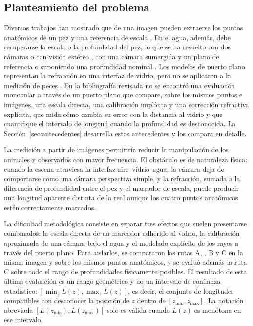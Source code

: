 \subsection{Planteamiento del problema}

Diversos trabajos han mostrado que de una imagen pueden extraerse los puntos anatómicos de un pez y una referencia de escala \parencite{Monkman2019,Saleh2023,Tseng2020}. En el agua, además, debe recuperarse la escala o la profundidad del pez, lo que se ha resuelto con dos cámaras o con visión estéreo \parencite{AlJubouri2017,Zhou2023,Seibold2026}, con una cámara sumergida y un plano de referencia \parencite{Vijayalakshmi2026} o suponiendo una profundidad nominal \parencite{Yin2026}. Los modelos de puerto plano representan la refracción en una interfaz de vidrio, pero no se aplicaron a la medición de peces \parencite{Luczynski2017,Seegraber2025}. En la bibliografía revisada no se encontró una evaluación monocular a través de un puerto plano que compare, sobre los mismos puntos e imágenes, una escala directa, una calibración implícita y una corrección refractiva explícita, que mida cómo cambia su error con la distancia al vidrio y que cuantifique el intervalo de longitud cuando la profundidad es desconocida. La Sección~\ref{sec:antecedentes} desarrolla estos antecedentes y los compara en detalle.


La medición a partir de imágenes permitiría reducir la manipulación de los animales y observarlos con mayor frecuencia. El obstáculo es de naturaleza física: cuando la escena atraviesa la interfaz aire--vidrio--agua, la cámara deja de comportarse como una cámara perspectiva simple, y la refracción, sumada a la diferencia de profundidad entre el pez y el marcador de escala, puede producir una longitud aparente distinta de la real aunque los cuatro puntos anatómicos estén correctamente marcados.

La dificultad metodológica consiste en separar tres efectos que suelen presentarse combinados: la escala directa de un marcador adherido al vidrio, la calibración aproximada de una cámara bajo el agua y el modelado explícito de los rayos a través del puerto plano. Para aislarlos, se compararon las rutas A, \Aprime, B y C en la misma imagen y sobre los mismos puntos anatómicos, y se evaluó además la ruta C sobre todo el rango de profundidades físicamente posibles. El resultado de esta última evaluación es un rango geométrico y no un intervalo de confianza estadístico: $[\min_{z} L(z), \max_{z} L(z)]$, es decir, el conjunto de longitudes compatibles con desconocer la posición de $z$ dentro de $[z_{\min}, z_{\max}]$. La notación abreviada $[L(z_{\min}), L(z_{\max})]$ solo es válida cuando $L(z)$ es monótona en ese intervalo.

